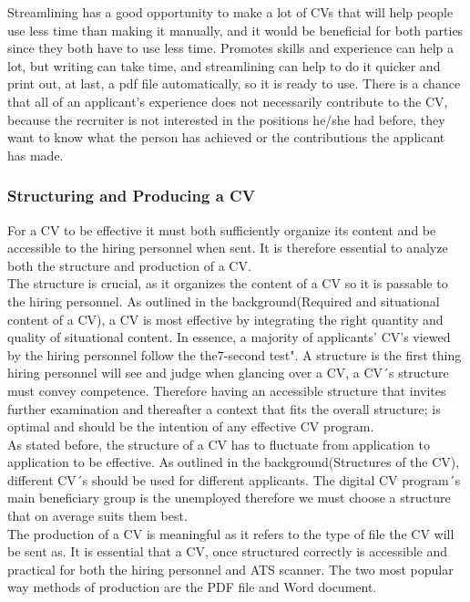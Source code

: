 Streamlining has a good opportunity to make a lot of CVs that will help people use less time than making it manually,
and it would be beneficial for both parties since they both have to use less time.
Promotes skills and experience can help a lot, but writing can take time, and streamlining can help to do it quicker 
and print out, at last, a pdf file automatically, so it is ready to use.
There is a chance that all of an applicant's experience does not necessarily contribute to the CV, 
because the recruiter is not interested in the positions he/she had before, they want to know what the person has achieved
or the contributions the applicant has made. 

\subsubsection{Structuring and Producing a CV}
For a CV to be effective it must both sufficiently organize its content and be accessible to the hiring personnel when sent.
It is therefore essential to analyze both the structure and production of a CV. \\

The structure is crucial, as it organizes the content of a CV so it is passable to the hiring personnel.
As outlined in the background(Required and situational content of a CV), a CV is most effective by integrating the right quantity and quality of situational content.
In essence, a majority of applicants' CV's viewed by the hiring personnel follow the the7-second test".
A structure is the first thing hiring personnel will see and judge when glancing over a CV, a CV´s structure must convey competence.
Therefore having an accessible structure that invites further examination and thereafter a context that fits the overall structure;
is optimal and should be the intention of any effective CV program. \\

As stated before, the structure of a CV has to fluctuate from application to application to be effective.
As outlined in the background(Structures of the CV), different CV´s should be used for different applicants.
The digital CV program´s main beneficiary group is the unemployed therefore we must choose a structure that on average suits them best. \\

The production of a CV is meaningful as it refers to the type of file the CV will be sent as.
It is essential that a CV, once structured correctly is accessible and practical for both the hiring personnel and ATS scanner.
The two most popular way methods of production are the PDF file and Word document. \\

